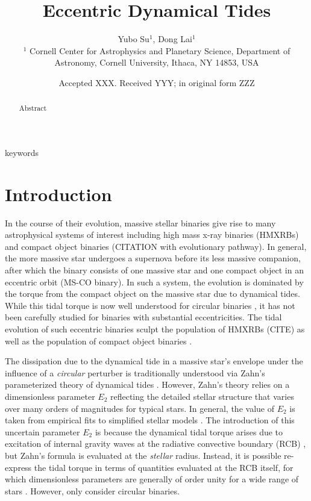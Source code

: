 \documentclass[
        fleqn,
        usenatbib,
    ]{mnras}
\title[Eccentric Dynamical Tides]{Eccentric Dynamical Tides}
\author[Y. Su, D. Lai.]{
Yubo Su$^1$,
Dong Lai$^1$
\\
$^1$ Cornell Center for Astrophysics and Planetary Science, Department of
Astronomy, Cornell University, Ithaca, NY 14853, USA
}
\date{Accepted XXX\@. Received YYY\@; in original form ZZZ}
\begin{document}
\label{firstpage}
\pagerange{\pageref{firstpage}--\pageref{lastpage}}
\maketitle

\begin{abstract}
    Abstract
\end{abstract}

\begin{keywords}
keywords
\end{keywords}

\section{Introduction}

In the course of their evolution, massive stellar binaries give rise to many
astrophysical systems of interest including high mass x-ray binaries (HMXRBs)
and compact object binaries (CITATION with evolutionary pathway). In general,
the more massive star undergoes a supernova before its less massive companion,
after which the binary consists of one massive star and one compact object in an
eccentric orbit (MS-CO binary). In such a system, the evolution is dominated by
the torque from the compact object on the massive star due to dynamical tides.
While this tidal torque is now well understood for circular binaries
\citep{kushnir}, it has not been carefully studied for binaries with substantial
eccentricities. The tidal evolution of such eccentric binaries sculpt the
population of HMXRBs (CITE) as well as the population of compact object binaries
\citep{vigna2020common}.

The dissipation due to the dynamical tide in a massive star's envelope under the
influence of a \emph{circular} perturber is traditionally understood via Zahn's
parameterized theory of dynamical tides \citep{zahn1975dynamical}. However,
Zahn's theory relies on a dimensionless parameter $E_2$ reflecting the detailed
stellar structure that varies over many orders of magnitudes for typical stars.
In general, the value of $E_2$ is taken from empirical fits to simplified
stellar models \citep{hurley2002evolution, vigna2020common}. The introduction of
this uncertain parameter $E_2$ is because the dynamical tidal torque arises due
to excitation of internal gravity waves at the radiative convective boundary
(RCB) \citep{goldreich1989tidal, savonije1983tidal}, but Zahn's formula is
evaluated at the \emph{stellar} radius. Instead, it is possible re-express the
tidal torque in terms of quantities evaluated at the RCB itself, for which
dimensionless parameters are generally of order unity for a wide range of stars
\citep{kushnir}. However, \citet{kushnir} only consider circular binaries.
\end{document}
